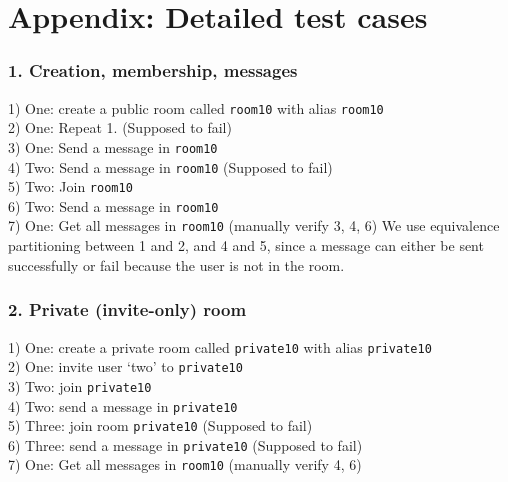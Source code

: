 \documentclass{article}
\begin{document}
\pagebreak
\section*{Appendix: Detailed test cases}
\subsubsection*{1. Creation, membership, messages}
1) One: create a public room called \texttt{room10} with alias \texttt{room10}\\
2) One: Repeat 1. (Supposed to fail)\\
3) One: Send a message in \texttt{room10}\\
4) Two: Send a message in \texttt{room10} (Supposed to fail)\\
5) Two: Join \texttt{room10}\\
6) Two: Send a message in \texttt{room10}\\
7) One: Get all messages in \texttt{room10} (manually verify 3, 4, 6)
We use equivalence partitioning between 1 and 2, and 4 and 5, since a message can either be sent successfully or fail because the user is not in the room.

\subsubsection*{2. Private (invite-only) room}
1) One: create a private room called \texttt{private10} with alias \texttt{private10}\\
2) One: invite user `two' to \texttt{private10}\\
3) Two: join \texttt{private10}\\
4) Two: send a message in \texttt{private10}\\
5) Three: join room \texttt{private10} (Supposed to fail)\\
6) Three: send a message in \texttt{private10} (Supposed to fail)\\
7) One: Get all messages in \texttt{room10} (manually verify 4, 6)
\end{document}
